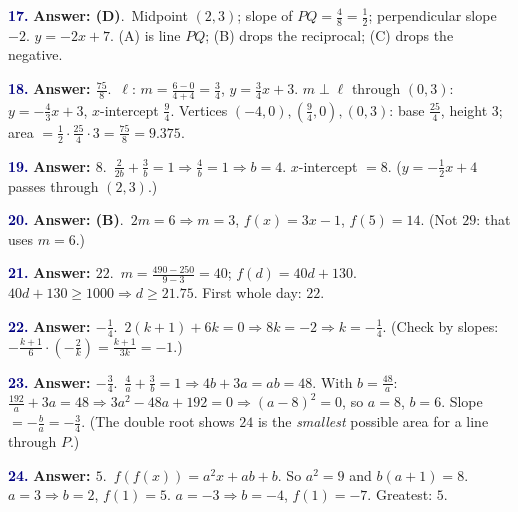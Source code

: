 \documentclass[10pt]{article}
\begin{document}
\begin{minipage}{\linewidth}\textbf{\textcolor{NAVY}{17.}} \textbf{Answer: (D)}.\ Midpoint $(2,3)$; slope of $PQ=\frac{4}{8}=\frac12$; perpendicular slope $-2$. $y=-2x+7$. (A) is line $PQ$; (B) drops the reciprocal; (C) drops the negative.\end{minipage}\par\vspace{5pt}
\begin{minipage}{\linewidth}\textbf{\textcolor{NAVY}{18.}} \textbf{Answer: $\tfrac{75}{8}$}.\ $\ell$: $m=\frac{6-0}{4+4}=\frac34$, $y=\frac34x+3$. $m\perp\ell$ through $(0,3)$: $y=-\frac43x+3$, $x$-intercept $\frac94$. Vertices $(-4,0),(\frac94,0),(0,3)$: base $\frac{25}4$, height $3$; area $=\frac12\cdot\frac{25}4\cdot3=\frac{75}8=9.375$.\end{minipage}\par\vspace{5pt}
\begin{minipage}{\linewidth}\textbf{\textcolor{NAVY}{19.}} \textbf{Answer: $8$}.\ $\frac{2}{2b}+\frac3b=1\Rightarrow\frac4b=1\Rightarrow b=4$. $x$-intercept $=8$. ($y=-\frac12x+4$ passes through $(2,3)$.)\end{minipage}\par\vspace{5pt}
\begin{minipage}{\linewidth}\textbf{\textcolor{NAVY}{20.}} \textbf{Answer: (B)}.\ $2m=6\Rightarrow m=3$, $f(x)=3x-1$, $f(5)=14$. (Not $29$: that uses $m=6$.)\end{minipage}\par\vspace{5pt}
\begin{minipage}{\linewidth}\textbf{\textcolor{NAVY}{21.}} \textbf{Answer: $22$}.\ $m=\frac{490-250}{9-3}=40$; $f(d)=40d+130$. $40d+130\ge1000\Rightarrow d\ge21.75$. First whole day: $22$.\end{minipage}\par\vspace{5pt}
\begin{minipage}{\linewidth}\textbf{\textcolor{NAVY}{22.}} \textbf{Answer: $-\tfrac{1}{4}$}.\ $2(k+1)+6k=0\Rightarrow8k=-2\Rightarrow k=-\frac14$. (Check by slopes: $-\frac{k+1}{6}\cdot\left(-\frac2k\right)=\frac{k+1}{3k}=-1$.)\end{minipage}\par\vspace{5pt}
\begin{minipage}{\linewidth}\textbf{\textcolor{NAVY}{23.}} \textbf{Answer: $-\tfrac{3}{4}$}.\ $\frac4a+\frac3b=1\Rightarrow4b+3a=ab=48$. With $b=\frac{48}a$: $\frac{192}a+3a=48\Rightarrow3a^2-48a+192=0\Rightarrow(a-8)^2=0$, so $a=8$, $b=6$. Slope $=-\frac ba=-\frac34$. (The double root shows $24$ is the \emph{smallest} possible area for a line through $P$.)\end{minipage}\par\vspace{5pt}
\begin{minipage}{\linewidth}\textbf{\textcolor{NAVY}{24.}} \textbf{Answer: $5$}.\ $f(f(x))=a^2x+ab+b$. So $a^2=9$ and $b(a+1)=8$. $a=3\Rightarrow b=2$, $f(1)=5$. $a=-3\Rightarrow b=-4$, $f(1)=-7$. Greatest: $5$.\end{minipage}\par\vspace{5pt}
\end{document}
